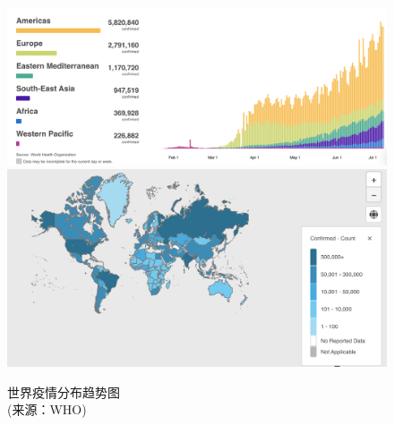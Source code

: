 \documentclass[]{article}
\begin{document}
\begin{figure}[H]

\caption{世界疫情分布趋势图\\ \vspace{-3mm}(来源：WHO)} %
\centering
\includegraphics[]{./input/covid1.png} %
\includegraphics[]{./input/covid4.png}
\label{} %
\end{figure}
\end{document}
